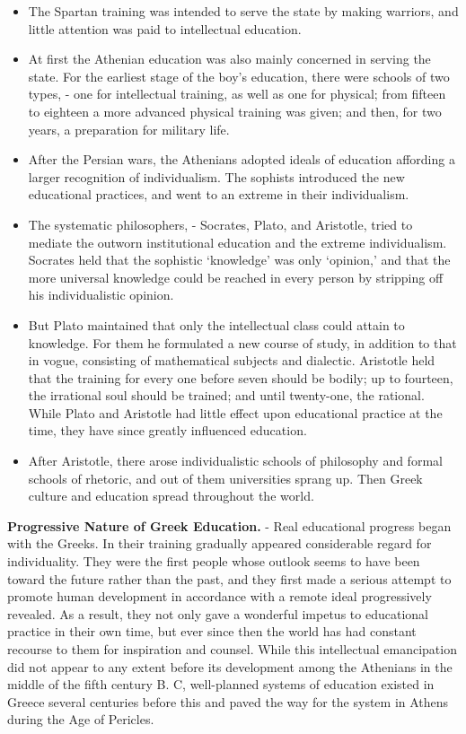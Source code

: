 \documentclass[]{book}
\providecommand{\tightlist}{%
  \setlength{\itemsep}{0pt}\setlength{\parskip}{0pt}}
\begin{document}
\begin{itemize}
\tightlist
\item
  The Spartan training was intended to serve the state by making warriors, and little attention was paid to intellectual education.
\item
  At first the Athenian education was also mainly concerned in serving the state. For the earliest stage of the boy's education, there were schools of two types, - one for intellectual training, as well as one for physical; from fifteen to eighteen a more advanced physical training was given; and then, for two years, a preparation for military life.
\item
  After the Persian wars, the Athenians adopted ideals of education affording a larger recognition of individualism. The sophists introduced the new educational practices, and went to an extreme in their individualism.
\item
  The systematic philosophers, - Socrates, Plato, and Aristotle, tried to mediate the outworn institutional education and the extreme individualism. Socrates held that the sophistic `knowledge' was only `opinion,' and that the more universal knowledge could be reached in every person by stripping off his individualistic opinion.
\item
  But Plato maintained that only the intellectual class could attain to knowledge. For them he formulated a new course of study, in addition to that in vogue, consisting of mathematical subjects and dialectic. Aristotle held that the training for every one before seven should be bodily; up to fourteen, the irrational soul should be trained; and until twenty-one, the rational. While Plato and Aristotle had little effect upon educational practice at the time, they have since greatly influenced education.
\item
  After Aristotle, there arose individualistic schools of philosophy and formal schools of rhetoric, and out of them universities sprang up. Then Greek culture and education spread throughout the world.
\end{itemize}

\textbf{Progressive Nature of Greek Education.} - Real educational progress began with the Greeks. In their training gradually appeared considerable regard for individuality. They were the first people whose outlook seems to have been toward the future rather than the past, and they first made a serious attempt to promote human development in accordance with a remote ideal progressively revealed. As a result, they not only gave a wonderful impetus to educational practice in their own time, but ever since then the world has had constant recourse to them for inspiration and counsel. While this intellectual emancipation did not appear to any extent before its development among the Athenians in the middle of the fifth century B. C, well-planned systems of education existed in Greece several centuries before this and paved the way for the system in Athens during the Age of Pericles.
\end{document}
